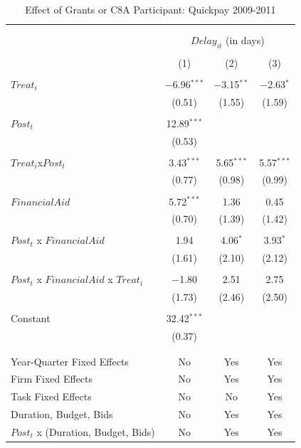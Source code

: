 \documentclass[
]{article}
\begin{document}
\begin{table}[H] \centering 
  \caption{Effect of Grants or C8A Participant: Quickpay 2009-2011} 
  \label{} 
\small 
\begin{tabular}{@{\extracolsep{-2pt}}lccc} 
\\[-1.8ex]\hline 
\hline \\[-1.8ex] 
\\[-1.8ex] & \multicolumn{3}{c}{$Delay_{it}$ (in days)} \\ 
\\[-1.8ex] & (1) & (2) & (3)\\ 
\hline \\[-1.8ex] 
 $Treat_i$ & $-$6.96$^{***}$ & $-$3.15$^{**}$ & $-$2.63$^{*}$ \\ 
  & (0.51) & (1.55) & (1.59) \\ 
  & & & \\ 
 $Post_t$ & 12.89$^{***}$ &  &  \\ 
  & (0.53) &  &  \\ 
  & & & \\ 
 $Treat_i$x$Post_t$ & 3.43$^{***}$ & 5.65$^{***}$ & 5.57$^{***}$ \\ 
  & (0.77) & (0.98) & (0.99) \\ 
  & & & \\ 
 $FinancialAid$ & 5.72$^{***}$ & 1.36 & 0.45 \\ 
  & (0.70) & (1.39) & (1.42) \\ 
  & & & \\ 
 $Post_t$ x $FinancialAid$ & 1.94 & 4.06$^{*}$ & 3.93$^{*}$ \\ 
  & (1.61) & (2.10) & (2.12) \\ 
  & & & \\ 
 $Post_t$ x $FinancialAid$ x $Treat_i$ & $-$1.80 & 2.51 & 2.75 \\ 
  & (1.73) & (2.46) & (2.50) \\ 
  & & & \\ 
 Constant & 32.42$^{***}$ &  &  \\ 
  & (0.37) &  &  \\ 
  & & & \\ 
\hline \\[-1.8ex] 
Year-Quarter Fixed Effects & No & Yes & Yes \\ 
Firm Fixed Effects & No & Yes & Yes \\ 
Task Fixed Effects & No & No & Yes \\ 
Duration, Budget, Bids & No & Yes & Yes \\ 
$Post_t$  x  (Duration, Budget, Bids) & No & Yes & Yes \\ 

\end{tabular}
\end{table}
\end{document}
